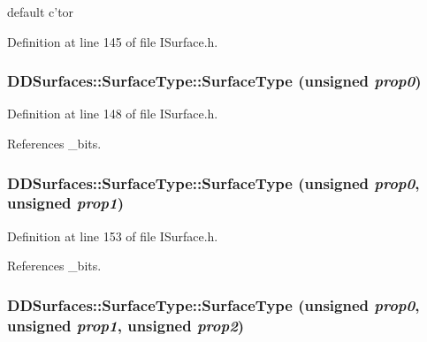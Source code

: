 default c'tor 

Definition at line 145 of file ISurface.h.\hypertarget{class_d_d_surfaces_1_1_surface_type_a1eddfb236b06b6d2073b9cf5db598bc8}{
\subsubsection[{SurfaceType}]{\setlength{\rightskip}{0pt plus 5cm}DDSurfaces::SurfaceType::SurfaceType (unsigned {\em prop0})}}
\label{class_d_d_surfaces_1_1_surface_type_a1eddfb236b06b6d2073b9cf5db598bc8}


Definition at line 148 of file ISurface.h.

References \_\-bits.\hypertarget{class_d_d_surfaces_1_1_surface_type_a080fbe4b3790adf465b77f5187440e31}{
\subsubsection[{SurfaceType}]{\setlength{\rightskip}{0pt plus 5cm}DDSurfaces::SurfaceType::SurfaceType (unsigned {\em prop0}, \/  unsigned {\em prop1})}}
\label{class_d_d_surfaces_1_1_surface_type_a080fbe4b3790adf465b77f5187440e31}


Definition at line 153 of file ISurface.h.

References \_\-bits.\hypertarget{class_d_d_surfaces_1_1_surface_type_a1edfc7bc6145d352f1dff360f91b97c0}{
\subsubsection[{SurfaceType}]{\setlength{\rightskip}{0pt plus 5cm}DDSurfaces::SurfaceType::SurfaceType (unsigned {\em prop0}, \/  unsigned {\em prop1}, \/  unsigned {\em prop2})}}
\label{class_d_d_surfaces_1_1_surface_type_a1edfc7bc6145d352f1dff360f91b97c0}


